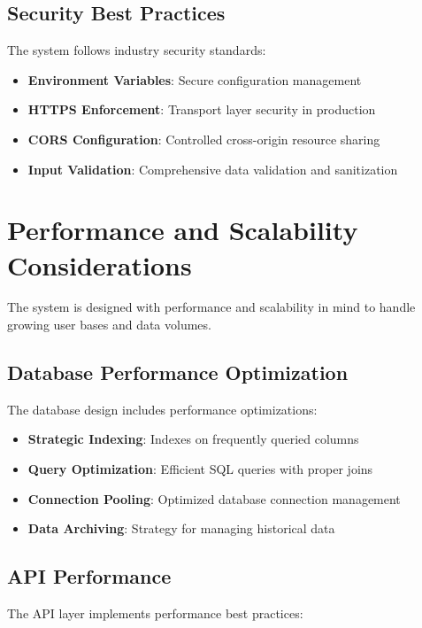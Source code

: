 \subsection{Security Best Practices}

The system follows industry security standards:

\begin{itemize}
    \item \textbf{Environment Variables}: Secure configuration management
    \item \textbf{HTTPS Enforcement}: Transport layer security in production
    \item \textbf{CORS Configuration}: Controlled cross-origin resource sharing
    \item \textbf{Input Validation}: Comprehensive data validation and sanitization
\end{itemize}

\section{Performance and Scalability Considerations}

The system is designed with performance and scalability in mind to handle growing user bases and data volumes.

\subsection{Database Performance Optimization}

The database design includes performance optimizations:

\begin{itemize}
    \item \textbf{Strategic Indexing}: Indexes on frequently queried columns
    \item \textbf{Query Optimization}: Efficient SQL queries with proper joins
    \item \textbf{Connection Pooling}: Optimized database connection management
    \item \textbf{Data Archiving}: Strategy for managing historical data
\end{itemize}

\subsection{API Performance}

The API layer implements performance best practices:

